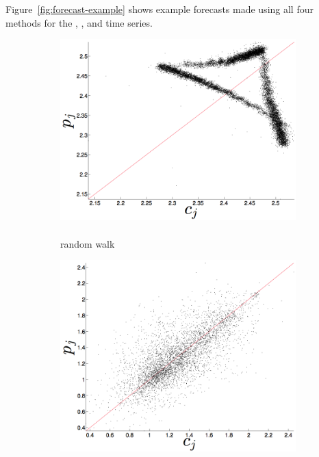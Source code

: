 Figure~\ref{fig:forecast-example} shows example forecasts made using
all four methods for the \col, \gcc, and \svdfive time series.
\begin{figure}[htbp]
  \centering
  
  \begin{subfigure}{0.6\columnwidth}
    \includegraphics[width=\columnwidth]{figs/colRWForecast.png}
    \caption{\col\\ random walk }
    \label{fig:colRW}
  \end{subfigure}%
   \begin{subfigure}{0.6\columnwidth}
    \includegraphics[width=\columnwidth]{figs/gccRWForecast.png}

\end{subfigure}
\end{figure}
